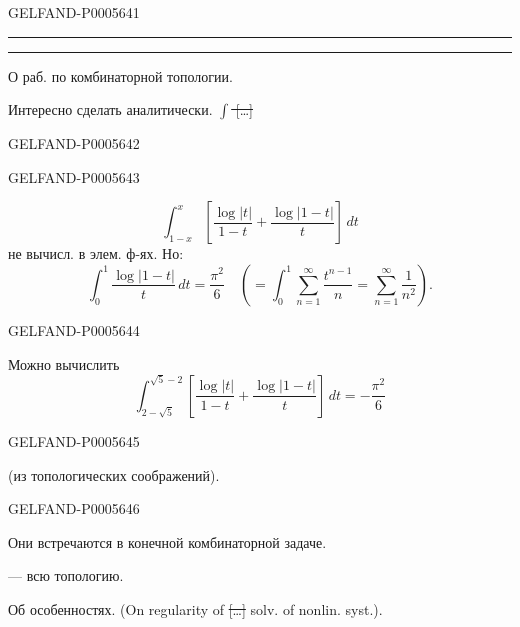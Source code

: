 \begin{GelfandAdjacentEvidence}{GELFAND-P000564}{1}
\noindent\hfill\rule{1.35cm}{.28pt}\enspace\rule{.55cm}{.40pt}\hfill\mbox{}\par
{}\qquad{}

О раб.  по комбинаторной топологии.

Интересно сделать аналитически.
\sout{\mbox{$\int$} […]}
\end{GelfandAdjacentEvidence}
\begin{GelfandAdjacentEvidence}{GELFAND-P000564}{2}

\end{GelfandAdjacentEvidence}
\begin{GelfandAdjacentEvidence}{GELFAND-P000564}{3}

\[
\int_{1-x}^{x}\left[\frac{\log|t|}{1-t}+\frac{\log|1-t|}{t}\right]\,dt
\]
не вычисл. в элем. ф-ях. Но:
\[
\int_0^1\frac{\log|1-t|}{t}\,dt=\frac{\pi^2}{6}
\quad\left(=\int_0^1\sum_{n=1}^{\infty}\frac{t^{n-1}}n
=\sum_{n=1}^{\infty}\frac1{n^2}\right).
\]
\end{GelfandAdjacentEvidence}
\begin{GelfandAdjacentEvidence}{GELFAND-P000564}{4}

Можно вычислить
\[
\int_{2-\sqrt5}^{\sqrt5-2}\left[\frac{\log|t|}{1-t}+\frac{\log|1-t|}{t}\right]\,dt
=-\frac{\pi^2}{6}
\]
\end{GelfandAdjacentEvidence}
\begin{GelfandAdjacentEvidence}{GELFAND-P000564}{5}

(из топологических соображений).
\end{GelfandAdjacentEvidence}
\begin{GelfandAdjacentEvidence}{GELFAND-P000564}{6}

Они встречаются в конечной комбинаторной задаче.

 — всю топологию.

 Об особенностях. (On regularity of \sout{[…]} solv. of nonlin. syst.).
\end{GelfandAdjacentEvidence}

